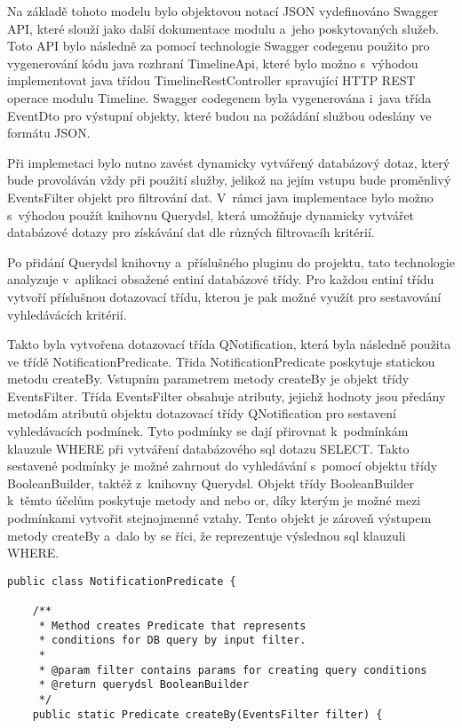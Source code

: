 \documentclass[twoside, 12pt]{article}
\begin{document}
{\clearpage

Na základě tohoto modelu bylo objektovou notací JSON vydefinováno Swagger API,
které slouží jako další dokumentace modulu a~jeho poskytovaných služeb.
Toto API bylo následně za pomocí technologie Swagger codegenu
použito pro vygenerování kódu java rozhraní TimelineApi,
které bylo možno s~výhodou implementovat java třídou TimelineRestController
spravující HTTP REST operace modulu Timeline.
Swagger codegenem byla vygenerována i~java třída EventDto pro výstupní objekty,
které budou na požádání službou odeslány ve formátu JSON.

Při implemetaci bylo nutno zavést dynamicky vytvářený databázový dotaz,
který bude provoláván vždy při použití služby,
jelikož na jejím vstupu bude proměnlivý EventsFilter objekt pro filtrování dat.
V~rámci java implementace bylo možno s~výhodou použít knihovnu Querydsl,
která umožňuje dynamicky vytvářet databázové dotazy
pro získávání dat dle různých filtrovacíh kritérií.

Po přidání Querydsl knihovny a~příslušného pluginu do projektu,
tato technologie analyzuje v~aplikaci obsažené entiní databázové třídy.
Pro každou entiní třídu vytvoří příslušnou dotazovací třídu,
kterou je pak možné využít pro sestavování vyhledávácích kritérií.

Takto byla vytvořena dotazovací třída QNotification,
která byla následně použita ve třídě NotificationPredicate.
Třida NotificationPredicate poskytuje statickou metodu createBy.
Vstupním parametrem metody createBy je objekt třídy EventsFilter.
Třída EventsFilter obsahuje atributy, jejichž hodnoty jsou předány metodám atributů objektu
dotazovací třídy QNotification pro sestavení vyhledávacích podmínek.
Tyto podmínky se dají přirovnat k~podmínkám klauzule WHERE při vytváření databázového sql dotazu SELECT.
Takto sestavené podmínky je možné zahrnout do vyhledávání s~pomocí objektu třídy BooleanBuilder, taktéž z~knihovny Querydsl.
Objekt třídy BooleanBuilder k~těmto účelům poskytuje metody and nebo or,
díky kterým je možné mezi podmínkami vytvořit stejnojmenné vztahy.
Tento objekt je zároveň výstupem metody createBy a~dalo by se říci, že reprezentuje výslednou sql klauzuli WHERE.

\clearpage

\begin{lstlisting}
public class NotificationPredicate {

    /**
     * Method creates Predicate that represents
     * conditions for DB query by input filter.
     *
     * @param filter contains params for creating query conditions
     * @return querydsl BooleanBuilder
     */
    public static Predicate createBy(EventsFilter filter) {


\end{lstlisting}}
\end{document}
